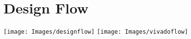 \section{Design Flow}

\begin{center}
	\texttt{[image: Images/designflow]}
	\hfill
	\texttt{[image: Images/vivadoflow]}
\end{center}

